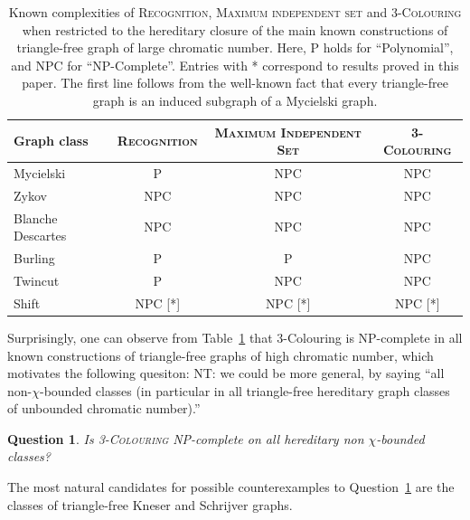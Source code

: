\documentclass[11pt,a4aper]{article}
\newtheorem{question}[theorem]{Question}
\newcommand{\nicolas}[1]{{\color{purple} NT: #1}}
\newcommand{\ugo}[1]{{\color{red} UG: #1}}
\begin{document}
\begin{table}[h!]
  \centering
  \begin{tabular}{|l|c|c|c|}
    \hline
    Graph class & \textsc{Recognition} & \textsc{Maximum Independent Set} & \textsc{3-Colouring} \\
    \hline
    Mycielski & P & NPC \cite{poljak1974Note} & NPC \cite{lovasz1973Covering,maffray1996NPcompleteness} \\
    Zykov & NPC \cite{marin2024Structural} & NPC \cite{marin2024Structural} & NPC \cite{marin2024Structural} \\
    Blanche Descartes & NPC \cite{marin2024Structural} & NPC \cite{marin2024Structural} & NPC \cite{marin2024Structural} \\
    Burling & P \cite{rzazewski2024Polynomial} & P \cite{rzazewski2024Polynomial} & NPC \cite{walczak2025Private}\\
    Twincut & P \cite{bourneuf2025Private} & NPC \cite{bourneuf2025Private} & NPC \cite{bourneuf2025Private} \\
    Shift & NPC [*] & NPC [*] & NPC [*] \\
    \hline
  \end{tabular}  
  \captionsetup{justification=raggedright}
  \caption{Known complexities of \textsc{Recognition}, \textsc{Maximum independent set} and \textsc{3-Colouring} when restricted to the hereditary closure of
  the main known constructions of triangle-free graph of large chromatic number. Here, P holds for ``Polynomial'', and NPC for ``NP-Complete''. Entries with * correspond to results proved in this paper. The first line follows from the well-known fact that every triangle-free graph is an induced subgraph of a Mycielski graph.}
  \label{tab:complexity}
\end{table}

Surprisingly, one can observe
from Table~\ref{tab:complexity} that 3-Colouring is NP-complete in all known
constructions of triangle-free graphs of high chromatic number, which motivates
the following quesiton: \nicolas{we could be more general, by saying
``all non-$\chi$-bounded classes (in particular in all triangle-free hereditary graph classes of unbounded
  chromatic number).''}
\begin{question}\label{qu:3col}
  Is \textsc{3-Colouring} NP-complete on all hereditary non $\chi$-bounded classes?
\end{question}
The most natural candidates for possible counterexamples to Question~\ref{qu:3col} are
the classes of triangle-free Kneser and
Schrijver graphs.   
\end{document}
